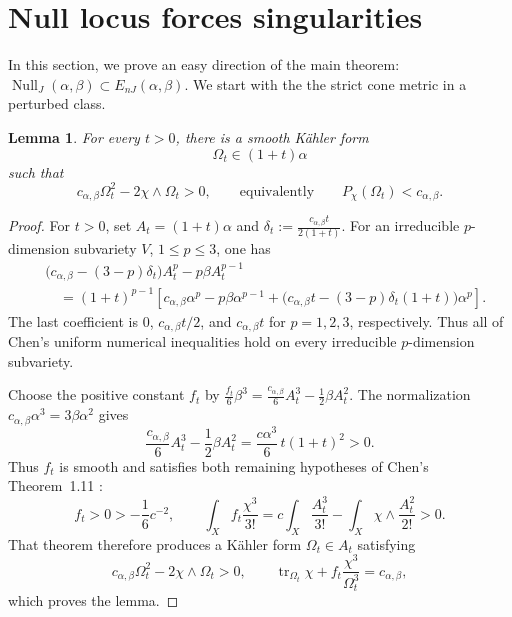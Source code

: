 \documentclass[reqno]{amsart}
\theoremstyle{remark}
\newcommand{\JNull}{\operatorname{Null}_{J}}
\newcommand{\JEnK}{E_{nJ}}
\newcommand{\cab}{c_{\alpha,\beta}}
\theoremstyle{plain}
\newtheorem{lemma}[thm]{Lemma}
\begin{document}
\section{Null locus forces singularities}


In this section, we prove an easy direction of the main theorem: $\JNull(\alpha,\beta)\subset \JEnK(\alpha,
\beta).$ We start with the the strict cone metric in a perturbed class. 
\begin{lemma}
\label{lem:perturbed-subsolutions}
For every $t>0$, there is a smooth K\"ahler form
\[
 \Omega_t\in(1+t)\alpha
\]
such that
\[
 c_{\alpha,\beta}\Omega_t^2-2\chi\wedge\Omega_t>0,
 \qquad\text{equivalently}\qquad P_\chi(\Omega_t)<c_{\alpha,\beta}.
\]
\end{lemma}
\begin{proof}
    For $t>0$, set $A_t=(1+t)\alpha$ and $
 \delta_t:=\frac{\cab t}{2(1+t)}.$ 
For an irreducible $p$-dimension subvariety $V$, $1\leq p\leq3$, one has
\begin{align*}
 &\bigl(\cab-(3-p)\delta_t\bigr)A_t^p
       -p\beta A_t^{p-1}\\
 &\quad=(1+t)^{p-1}
 \left[
   \cab\alpha^p-p\beta\alpha^{p-1}
   +\bigl(\cab t-(3-p)\delta_t(1+t)\bigr)\alpha^p
 \right].
\end{align*}
The last coefficient is $0$, $\cab t/2$, and $\cab t$ for
$p=1,2,3$, respectively.  Thus all of Chen's uniform numerical
inequalities hold on every irreducible  $p$-dimension subvariety.  

Choose the positive constant $f_t$ by $
 \frac{f_t}{6}\beta^3
 =\frac{ c_{\alpha,\beta}}{6} A_t^3-\frac12\beta A_t^2.$ 
The normalization $c_{\alpha,\beta}\alpha^3=3\beta\alpha^2$ gives
\[
 \frac{c_{\alpha,\beta}}{6} A_t^3-\frac12\beta A_t^2
 =\frac{c\alpha^3}{6}\,t(1+t)^2>0.
\]
Thus $f_t$ is smooth and satisfies both remaining hypotheses of
Chen's Theorem~1.11 \cite{C21}:
\[
 f_t>0>-\frac16c^{-2},
 \qquad
 \int_X f_t\frac{\chi^3}{3!}
 =c\int_X\frac{A_t^3}{3!}
   -\int_X\chi\wedge\frac{A_t^2}{2!}>0.
\]
That theorem therefore produces a K\"ahler form
$\Omega_t\in A_t$ satisfying
\[
 c_{\alpha,\beta}\Omega_t^2-2\chi\wedge\Omega_t>0,\qquad
 \operatorname{tr}_{\Omega_t}\chi
      +f_t\frac{\chi^3}{\Omega_t^3}=c_{\alpha,\beta},
\]
which proves the lemma.

\end{proof}
\end{document}
